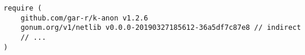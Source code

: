 \begin{lstlisting}[caption=The \texttt{go.mod} file,label=lst:go_mod,float,floatplacement=H]
require (
    github.com/gar-r/k-anon v1.2.6
    gonum.org/v1/netlib v0.0.0-20190327185612-36a5df7c87e8 // indirect
    // ...
)
\end{lstlisting}